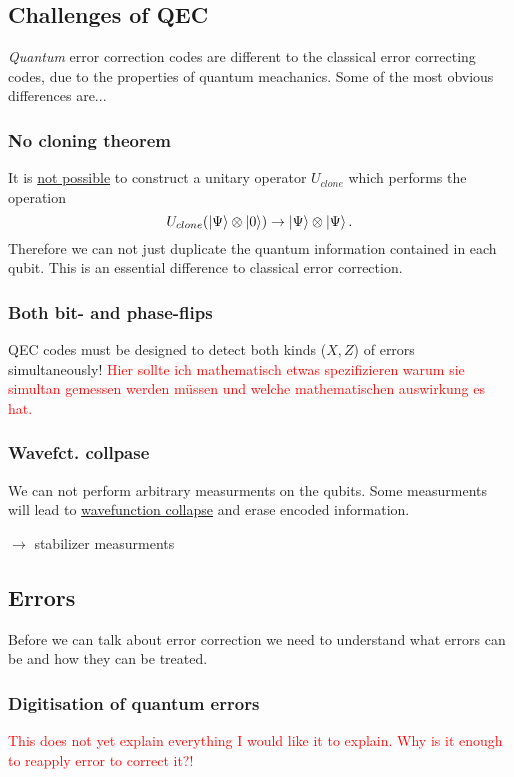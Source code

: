 \subsection{Challenges of QEC}
\textit{Quantum} error correction codes are different to the classical error correcting codes, 
due to the properties of quantum meachanics. 
Some of the most obvious differences are...


\subsubsection{No cloning theorem}
It is \hyperref[sec:basic.math.no_cloning_theorem]{not possible} to construct a unitary operator $U_{clone}$ 
which performs the operation
\begin{equation}
    U_{clone}(\ket{\Psi} \otimes \ket{0}) \rightarrow \ket{\Psi} \otimes\ket{\Psi}.
\end{equation}
Therefore we can not just duplicate the quantum information contained in each qubit. 
This is an essential difference to classical error correction. \cite{QECintro}


\subsubsection{Both bit- and phase-flips}
QEC codes must be designed to detect both kinds ($X,Z$) of errors simultaneously! \cite{QECintro}
\textcolor{red}{
    Hier sollte ich mathematisch etwas spezifizieren warum sie simultan gemessen werden müssen 
    und welche mathematischen auswirkung es hat.}


\subsubsection{Wavefct. collpase}
We can not perform arbitrary measurments on the qubits. 
Some measurments will lead to \hyperref[sec:basic.math.wavefct_collpase]{wavefunction collapse} 
and erase encoded information. \cite{QECintro}

$\rightarrow$ stabilizer measurments



\subsection{Errors}
Before we can talk about error correction we need to understand what errors can be and how they can be treated.


\subsubsection{Digitisation of quantum errors}
\textcolor{red}{
    This does not yet explain everything I would like it to explain. 
    Why is it enough to reapply error to correct it?!} 

